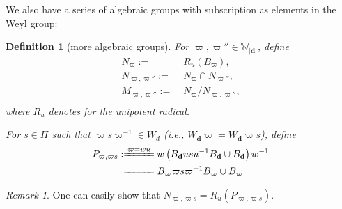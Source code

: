 \documentclass[reqno,11pt]{book}
\numberwithin{equation}{section}
\theoremstyle{plain}
\newtheorem{defn}[theorem]{Definition}
\theoremstyle{plain}
\numberwithin{equation}{section}
\theoremstyle{remark}
\newtheorem{remark}[theorem]{Remark}
\newcommand{\dimvec}[1]{\mathbf{#1}}
\newcommand{\abdimvec}[1]{|\dimvec{#1}|}
\newcommand{\absgp}[1]{\mathbb{#1}}
\newcommand{\ww}{\varpi}
\begin{document}
We also have a series of algebraic groups with subscription as elements in the Weyl group:
\begin{defn}[more algebraic groups]
For $\ww, \ww'' \in \absgp{W}_{\abdimvec{d}}$, define
\begin{equation*}
\begin{aligned}
  N_{\ww}:=\;& R_u(B_{\ww}),  \\ 
  N_{\ww,\ww''}:=\;& N_{\ww} \cap N_{\ww''},  \\ 
  M_{\ww,\ww''}:=\;& N_{\ww}/N_{\ww,\ww''},  \\ 
\end{aligned}
\end{equation*}
where $R_u$ denotes for the unipotent radical.

For $s \in \Pi$ such that $\ww s \ww^{-1} \in W_d$ (i.e., $W_{\dimvec{d}}\ww=W_{\dimvec{d}}\ww s$), define
\begin{equation*}
\begin{aligned}
  P_{\ww,\ww s}:\xlongequal{\ww =wu}\;& w\left( B_{\dimvec{d}} usu^{-1} B_{\dimvec{d}} \cup B_{\dimvec{d}} \right)w^{-1} \\ 
  \xlongequal{\phantom{\ww =wu}}\;&  B_{\ww} \ww s\ww^{-1} B_{\ww} \cup B_{\ww}  \\ 
\end{aligned}
\end{equation*}
\end{defn}
\begin{remark}
One can easily show that $N_{\ww, \ww s}=R_u (P_{\ww, \ww s})$.
\end{remark}
\setlength\arraycolsep{1pt}
\renewcommand{\arraystretch}{0.6}


\end{document}
